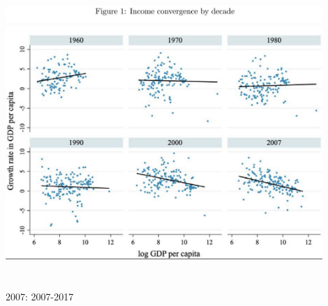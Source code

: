 \begin{frame}[label = ConvergenceIn2000]{}
\begin{columns}[T]
\includegraphics[width=12cm]{1/ConvergenceIn2000s.jpg}\\
\citet{KremerWillisYou2022}\\~\\
2007: 2007-2017\\
\hfill\hyperlink{ConvergenceResults<2>}{}
\end{columns}
\end{frame}



